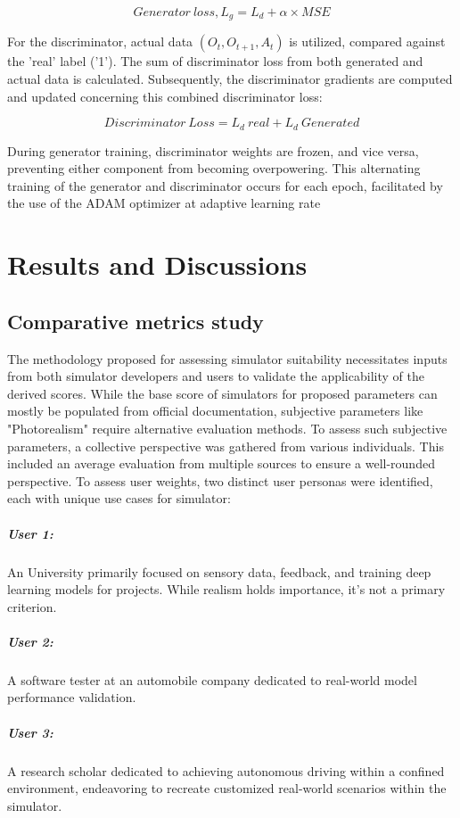 \documentclass[12pt,twoside,a4paper,parskip]{scrbook} %
\begin{document}
\[Generator\ loss, L_g = L_d + \alpha \times MSE\]

For the discriminator, actual data \((O_t, O_{t+1}, A_t)\) is utilized, compared against the 'real' label ('1'). The sum of discriminator loss from both generated and actual data is calculated. Subsequently, the discriminator gradients are computed and updated concerning this combined discriminator loss:

\[Discriminator\ Loss = L_d\ real + L_d\ Generated\]

During generator training, discriminator weights are frozen, and vice versa, preventing either component from becoming overpowering. This alternating training of the generator and discriminator occurs for each epoch, facilitated by the use of the ADAM optimizer at adaptive learning rate
\chapter{Results and Discussions}
\section{Comparative metrics study}
The methodology proposed for assessing simulator suitability necessitates inputs from both simulator developers and users to validate the applicability of the derived scores. While the base score of simulators for proposed parameters can mostly be populated from official documentation, subjective parameters like "Photorealism" require alternative evaluation methods. To assess such subjective parameters, a collective perspective was gathered from various individuals. This included an average evaluation from multiple sources to ensure a well-rounded perspective. 
To assess user weights, two distinct user personas were identified, each with unique use cases for simulator:
\paragraph*{User 1: }  An University primarily focused on sensory data, feedback, and training deep learning models for projects. While realism holds importance, it's not a primary criterion.
\paragraph*{User 2: } A software tester at an automobile company dedicated to real-world model performance validation.
\paragraph*{User 3: } A research scholar dedicated to achieving autonomous driving within a confined environment, endeavoring to recreate customized real-world scenarios within the simulator.
\end{document}
